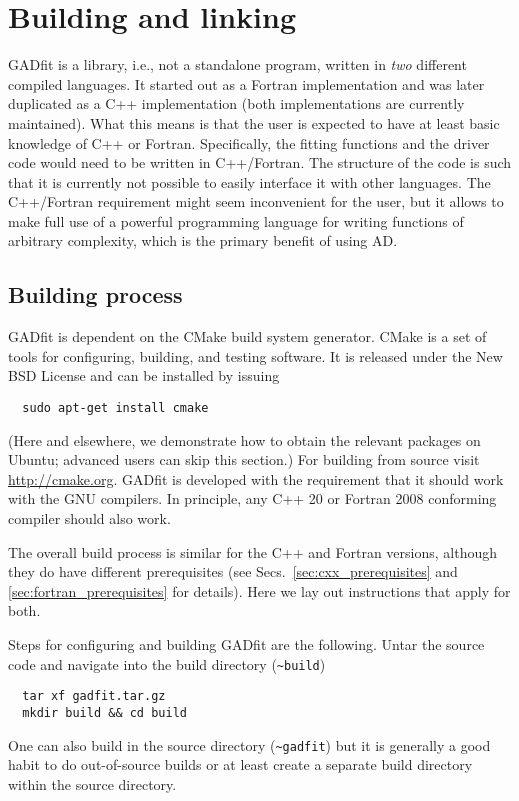 \documentclass{article}
\begin{document}
\section{Building and linking}

GADfit is a library, i.e., not a standalone program, written in \textit{two} different compiled languages. It started out as a Fortran implementation and was later duplicated as a C++ implementation (both implementations are currently maintained). What this means is that the user is expected to have at least basic knowledge of C++ or Fortran. Specifically, the fitting functions and the driver code would need to be written in C++/Fortran. The structure of the code is such that it is currently not possible to easily interface it with other languages. The C++/Fortran requirement might seem inconvenient for the user, but it allows to make full use of a powerful programming language for writing functions of arbitrary complexity, which is the primary benefit of using AD.

\subsection{Building process}

GADfit is dependent on the CMake build system generator. CMake is a set of tools for configuring, building, and testing software. It is released under the New BSD License and can be installed by issuing
\begin{verbatim}
  sudo apt-get install cmake
\end{verbatim}
(Here and elsewhere, we demonstrate how to obtain the relevant packages on Ubuntu; advanced users can skip this section.) For building from source visit \url{http://cmake.org}. GADfit is developed with the requirement that it should work with the GNU compilers. In principle, any C++ 20 or Fortran 2008 conforming compiler should also work.

The overall build process is similar for the C++ and Fortran versions, although they do have different prerequisites (see Secs.~\ref{sec:cxx_prerequisites} and \ref{sec:fortran_prerequisites} for details). Here we lay out instructions that apply for both.

Steps for configuring and building GADfit are the following. Untar the source code and navigate into the build directory (\verb+~build+)
\begin{verbatim}
  tar xf gadfit.tar.gz
  mkdir build && cd build
\end{verbatim}
One can also build in the source directory (\verb+~gadfit+) but it is generally a good habit to do out-of-source builds or at least create a separate build directory within the source directory.
\end{document}

